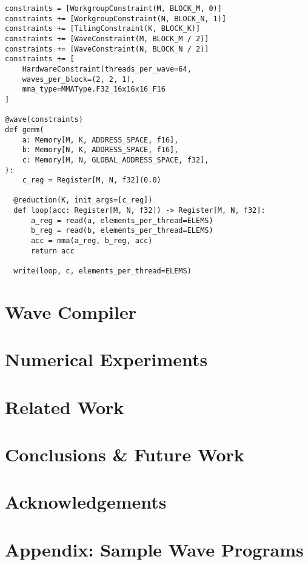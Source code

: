 \documentclass{article}
\begin{document}
\begin{lstlisting}[language=Wave, frame=single, breaklines, caption={Mixed-precision $C = A \times B^{T}$ expressed in Wave.}, captionpos=b, label={lst:gemm}]
constraints = [WorkgroupConstraint(M, BLOCK_M, 0)]
constraints += [WorkgroupConstraint(N, BLOCK_N, 1)]
constraints += [TilingConstraint(K, BLOCK_K)]
constraints += [WaveConstraint(M, BLOCK_M / 2)]
constraints += [WaveConstraint(N, BLOCK_N / 2)]
constraints += [
    HardwareConstraint(threads_per_wave=64,
    waves_per_block=(2, 2, 1),
    mma_type=MMAType.F32_16x16x16_F16
]

@wave(constraints)
def gemm(
    a: Memory[M, K, ADDRESS_SPACE, f16],
    b: Memory[N, K, ADDRESS_SPACE, f16],
    c: Memory[M, N, GLOBAL_ADDRESS_SPACE, f32],
):
    c_reg = Register[M, N, f32](0.0)

  @reduction(K, init_args=[c_reg])
  def loop(acc: Register[M, N, f32]) -> Register[M, N, f32]:
      a_reg = read(a, elements_per_thread=ELEMS)
      b_reg = read(b, elements_per_thread=ELEMS)
      acc = mma(a_reg, b_reg, acc)
      return acc

  write(loop, c, elements_per_thread=ELEMS)
\end{lstlisting}

\section{Wave Compiler}
\label{section:wave_compiler}

\section{Numerical Experiments}
\label{section:numerical_experiments}

\section{Related Work}
\label{section:related_work}

\section{Conclusions \& Future Work}
\label{section:conclusions}

\section{Acknowledgements}
\label{section:acknowledgements}

\section{Appendix: Sample Wave Programs}
\label{section:samples}
\end{document}
